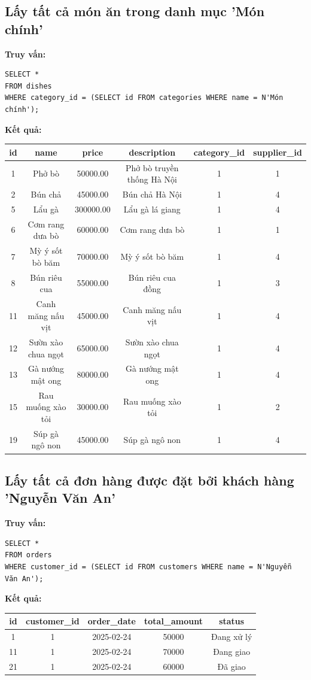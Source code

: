 \documentclass{article}
\begin{document}
\subsection{Lấy tất cả món ăn trong danh mục 'Món chính'}

\textbf{Truy vấn:}

\begin{verbatim}
SELECT *
FROM dishes
WHERE category_id = (SELECT id FROM categories WHERE name = N'Món chính');
\end{verbatim}

\textbf{Kết quả:}
\begin{longtable}{|c|c|c|c|c|c|}
\hline
id & name & price & description & category\_id & supplier\_id \\
\hline
1 & Phở bò & 50000.00 & Phở bò truyền thống Hà Nội & 1 & 1 \\
2 & Bún chả & 45000.00 & Bún chả Hà Nội & 1 & 4 \\
5 & Lẩu gà & 300000.00 & Lẩu gà lá giang & 1 & 4 \\
6 & Cơm rang dưa bò & 60000.00 & Cơm rang dưa bò & 1 & 1 \\
7 & Mỳ ý sốt bò băm & 70000.00 & Mỳ ý sốt bò băm & 1 & 4 \\
8 & Bún riêu cua & 55000.00 & Bún riêu cua đồng & 1 & 3 \\
11 & Canh măng nấu vịt & 45000.00 & Canh măng nấu vịt & 1 & 4 \\
12 & Sườn xào chua ngọt & 65000.00 & Sườn xào chua ngọt & 1 & 4 \\
13 & Gà nướng mật ong & 80000.00 & Gà nướng mật ong & 1 & 4 \\
15 & Rau muống xào tỏi & 30000.00 & Rau muống xào tỏi & 1 & 2 \\
19 & Súp gà ngô non & 45000.00 & Súp gà ngô non & 1 & 4 \\
\hline
\end{longtable}

\subsection{Lấy tất cả đơn hàng được đặt bởi khách hàng 'Nguyễn Văn An'}

\textbf{Truy vấn:}

\begin{verbatim}
SELECT *
FROM orders
WHERE customer_id = (SELECT id FROM customers WHERE name = N'Nguyễn Văn An');
\end{verbatim}

\textbf{Kết quả:}
\begin{longtable}{|c|c|c|c|c|}
\hline
id & customer\_id & order\_date & total\_amount & status \\
\hline
1 & 1 & 2025-02-24 & 50000 & Đang xử lý \\
11 & 1 & 2025-02-24 & 70000 & Đang giao \\
21 & 1 & 2025-02-24 & 60000 & Đã giao \\
\hline
\end{longtable}
\end{document}
